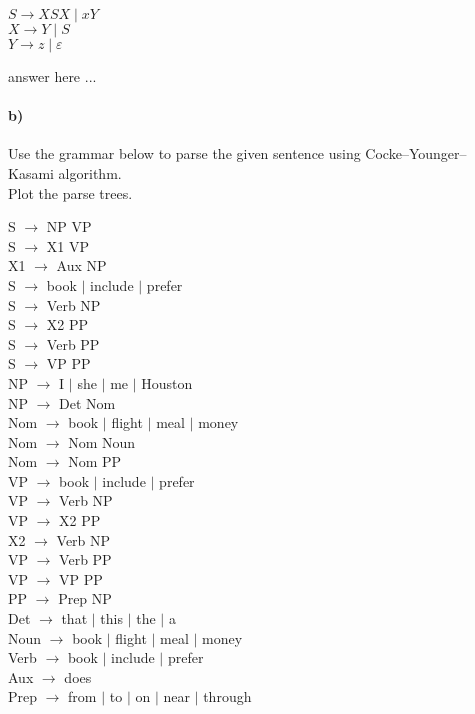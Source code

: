 \documentclass[a4paper,12pt]{article}
\begin{document}
$ S   \to XSX \mid xY $ \\
$ X   \to Y \mid S $ \\
$ Y   \to z \mid \varepsilon $ \\

\begin{tcolorbox}
answer here ...
\vspace{18cm} %
\end{tcolorbox}


\paragraph{b)} Use the grammar below to parse the given sentence using Cocke–Younger–Kasami algorithm. \\
Plot the parse trees. \\

\begin{multicols}{2}
S $\to$ NP VP \\
S $\to$ X1 VP \\
X1 $\to$ Aux NP \\
S $\to$ book $\mid$ include $\mid$ prefer \\
S $\to$ Verb NP \\
S $\to$ X2 PP \\
S $\to$ Verb PP \\
S $\to$ VP PP \\
NP $\to$ I $\mid$ she $\mid$ me $\mid$ Houston \\
NP $\to$ Det Nom \\
Nom $\to$ book $\mid$ flight $\mid$ meal $\mid$ money \\
Nom $\to$ Nom Noun \\
Nom $\to$ Nom PP \\
VP $\to$ book $\mid$ include $\mid$ prefer \\
VP $\to$ Verb NP \\
VP $\to$ X2 PP \\
X2 $\to$ Verb NP \\
VP $\to$ Verb PP \\
VP $\to$ VP PP \\
PP $\to$ Prep NP \\
Det $\to$ that $\mid$ this $\mid$ the $\mid$ a \\
Noun $\to$ book $\mid$ flight $\mid$ meal $\mid$ money \\
Verb $\to$ book $\mid$ include $\mid$ prefer \\
Aux $\to$ does \\
Prep $\to$ from $\mid$ to $\mid$ on $\mid$ near $\mid$ through \\
\end{multicols}
\end{document}
